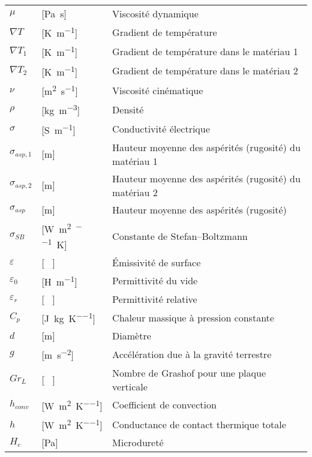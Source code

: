 \begin{longtable}{l p{3cm} p{5in}}
$\mu$ 				& [\si{\pascal\second}] 				& Viscosité dynamique  									\\
$\nabla T$			& [\si{\kelvin\per\metre}] 				& Gradient de température  								\\
$\nabla T_1$ 		& [\si{\kelvin\per\metre}] 				& Gradient de température dans le matériau 1 			\\
$\nabla T_2$ 		& [\si{\kelvin\per\metre}] 				& Gradient de température dans le matériau 2 			\\
$\nu$ 				& [\si{\square\metre\per\second}] 		& Viscosité cinématique  								\\
$\rho$ 				& [\si{\kilogram\per\cubic\metre}] 		& Densité 												\\
$\sigma$ 			& [\si{\siemens\per\metre}] 			& Conductivité électrique  								\\
$\sigma_{asp,1}$ 	& [\si{\metre}] 						& Hauteur moyenne des aspérités (rugosité) du matériau 1\\
$\sigma_{asp,2}$ 	& [\si{\metre}] 						& Hauteur moyenne des aspérités (rugosité) du matériau 2\\
$\sigma_{asp}$ 		& [\si{\metre}] 						& Hauteur moyenne des aspérités (rugosité) 				\\
$\sigma_{SB}$ 		& [\si{\watt\per\square\metre\per\raiseto{4}\kelvin}] 	& Constante de Stefan–Boltzmann			\\
$\varepsilon$ 		& [ \ ] 								& Émissivité de surface 								\\
$\varepsilon_0$ 	& [\si{\henry\per\metre}] 				& Permittivité du vide 									\\
$\varepsilon_r$ 	& [ \ ] 								& Permittivité relative 								\\
$C_p$ 				& [\si{\joule\per\kilogram\per\kelvin}] & Chaleur massique à pression constante 				\\
$d$					& [\si{\metre}] 						& Diamètre 												\\
$g$ 				& [\si{\metre\per\square\second}] 		& Accélération due à la gravité terrestre 				\\
$Gr_L$ 				& [ \ ] 								& Nombre de Grashof pour une plaque verticale 			\\
$h_{conv}$ 			& [\si{\watt\per\square\metre\per\kelvin}] 	& Coefficient de convection 						\\
$h$ 				& [\si{\watt\per\square\metre\per\kelvin}] 	& Conductance de contact thermique totale 			\\
$H_c$ 				& [\si{\pascal}] 						& Microdureté 											\\

\end{longtable}
